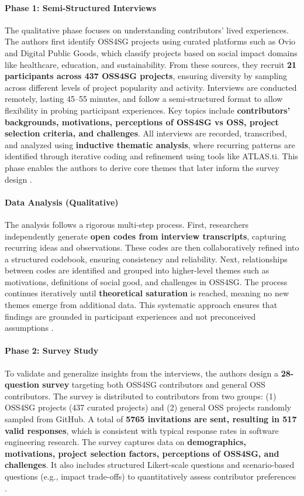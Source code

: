 \paragraph{Phase 1: Semi-Structured Interviews}
The qualitative phase focuses on understanding contributors’ lived experiences. The authors first identify OSS4SG projects using curated platforms such as Ovio and Digital Public Goods, which classify projects based on social impact domains like healthcare, education, and sustainability. From these sources, they recruit \textbf{21 participants across 437 OSS4SG projects}, ensuring diversity by sampling across different levels of project popularity and activity. Interviews are conducted remotely, lasting 45–55 minutes, and follow a semi-structured format to allow flexibility in probing participant experiences. Key topics include \textbf{contributors’ backgrounds, motivations, perceptions of OSS4SG vs OSS, project selection criteria, and challenges}. All interviews are recorded, transcribed, and analyzed using \textbf{inductive thematic analysis}, where recurring patterns are identified through iterative coding and refinement using tools like ATLAS.ti. This phase enables the authors to derive core themes that later inform the survey design .

\paragraph{Data Analysis (Qualitative)}
The analysis follows a rigorous multi-step process. First, researchers independently generate \textbf{open codes from interview transcripts}, capturing recurring ideas and observations. These codes are then collaboratively refined into a structured codebook, ensuring consistency and reliability. Next, relationships between codes are identified and grouped into higher-level themes such as motivations, definitions of social good, and challenges in OSS4SG. The process continues iteratively until \textbf{theoretical saturation} is reached, meaning no new themes emerge from additional data. This systematic approach ensures that findings are grounded in participant experiences and not preconceived assumptions .

\paragraph{Phase 2: Survey Study}
To validate and generalize insights from the interviews, the authors design a \textbf{28-question survey} targeting both OSS4SG contributors and general OSS contributors. The survey is distributed to contributors from two groups: (1) OSS4SG projects (437 curated projects) and (2) general OSS projects randomly sampled from GitHub. A total of \textbf{5765 invitations are sent, resulting in 517 valid responses}, which is consistent with typical response rates in software engineering research. The survey captures data on \textbf{demographics, motivations, project selection factors, perceptions of OSS4SG, and challenges}. It also includes structured Likert-scale questions and scenario-based questions (e.g., impact trade-offs) to quantitatively assess contributor preferences .

